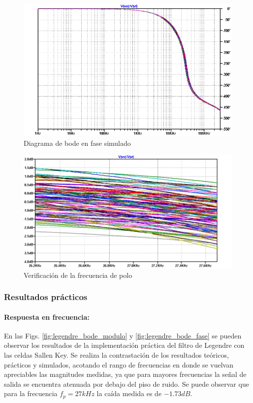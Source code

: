 \begin{figure}[H]
	\centering
	\includegraphics[scale=0.6]{../EJ1/Recursos/legendre_verificacion_fase.png}
	\caption{Diagrama de bode en fase simulado}
\end{figure}

\begin{figure}[H]
	\centering
	\includegraphics[scale=0.6]{../EJ1/Recursos/legendre_verificacion_fp.png}
	\caption{Verificaci\'on de la frecuencia de polo}
\end{figure}

\subsubsection{Resultados pr\'acticos}

\paragraph{Respuesta en frecuencia:} En las Figs. \ref{fig:legendre_bode_modulo} y \ref{fig:legendre_bode_fase} se pueden observar los resultados de la implementaci\'on
pr\'actica del filtro de Legendre con las celdas Sallen Key. Se realiza la contrastaci\'on de los resultados te\'oricos, pr\'acticos y simulados, acotando el rango de frecuencias
en donde se vuelvan apreciables las magnitudes medidas, ya que para mayores frecuencias la se\~nal de salida se encuentra atenuada por debajo del piso de ruido. Se puede observar que para
la frecuencia $f_p = 27kHz$ la ca\'ida medida es de $-1.73dB$.

